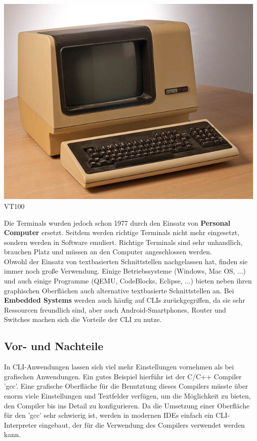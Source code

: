 \documentclass[12pt,a4paper]{report}
\begin{document}
\begin{onehalfspace}
\begin{center}
\includegraphics[scale=2.0]{img/vt100.jpg}\\
VT100 \cite{wiki09}
\end{center}

Die Terminals wurden jedoch schon 1977 durch den Einsatz von \textbf{Personal Computer} ersetzt. Seitdem werden richtige Terminals nicht mehr eingesetzt, sondern werden in Software emuliert. Richtige Terminals sind sehr unhandlich, brauchen Platz und müssen an den Computer angeschlossen werden. \cite{wiki09}\\

Obwohl der Einsatz von textbasierten Schnittstellen nachgelassen hat, finden sie immer noch große Verwendung. Einige Betriebssysteme (Windows, Mac OS, ...) und auch einige Programme (QEMU, CodeBlocks, Eclipse, ...) bieten neben ihren graphischen Oberflächen auch alternative textbasierte Schnittstellen an. Bei \textbf{Embedded Systems} werden auch häufig auf CLIs zurückgegriffen, da sie sehr Ressourcen freundlich sind, aber auch Android-Smartphones, Router und Switches machen sich die Vorteile der CLI zu nutze. \cite{wiki06}

\subsection{Vor- und Nachteile}

In CLI-Anwendungen lassen sich viel mehr Einstellungen vornehmen als bei grafischen Anwendungen. Ein gutes Beispiel hierführ ist der C/C++ Compiler 'gcc'. Eine grafische Oberfläche für die Benutztung dieses Compilers müsste über enorm viele Einstellungen und Textfelder verfügen, um die Möglichkeit zu bieten, den Compiler bis ins Detail zu konfigurieren. Da die Umsetzung einer Oberfläche für den 'gcc' sehr schwierig ist, werden in modernen IDEs einfach ein CLI-Interpreter eingebaut, der für die Verwendung des Compilers verwendet werden kann.\\


\end{onehalfspace}
\end{document}
